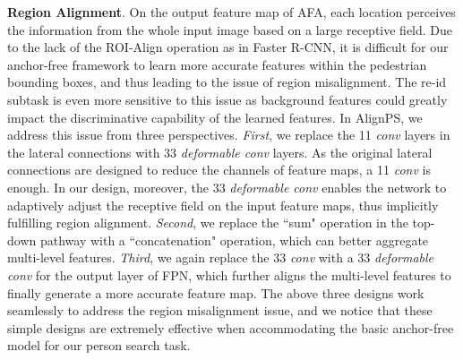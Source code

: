 \documentclass[journal]{IEEEtran}
\begin{document}
\textbf{Region Alignment}. On the output feature map of AFA, each location perceives the information from the whole input image based on a large receptive field. Due to the lack of the ROI-Align operation as in Faster R-CNN, it is difficult for our anchor-free framework to learn more accurate features within the pedestrian bounding boxes, and thus leading to the issue of region misalignment. The re-id subtask is even more sensitive to this issue as background features could greatly impact the discriminative capability of the learned features. In AlignPS, we address this issue from three perspectives. \emph{First}, we replace the 11 \emph{conv} layers in the lateral connections with 33 \emph{deformable conv} layers. As the original lateral connections are designed to reduce the channels of feature maps, a 11 \emph{conv} is enough. In our design, moreover, the 33 \emph{deformable conv} enables the network to adaptively adjust the receptive field on the input feature maps, thus implicitly fulfilling region alignment. \emph{Second}, we replace the ``sum" operation in the top-down pathway with a ``concatenation" operation, which can better aggregate multi-level features. \emph{Third}, we again replace the 33 \emph{conv} with a 33 \emph{deformable conv} for the output layer of FPN, which further aligns the multi-level features to finally generate a more accurate feature map. The above three designs work seamlessly to address the region misalignment issue, and we notice that these simple designs are extremely effective when accommodating the basic anchor-free model for our person search task.
\end{document}
